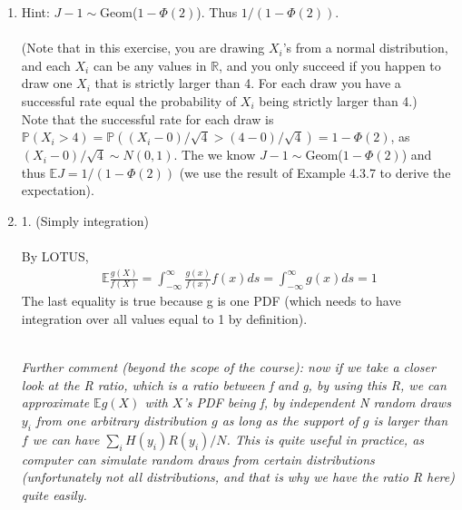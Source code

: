 

\setcounter{theorem}{54}
\begin{exercise}[BH.5.55]
\begin{solution}
    \begin{enumerate}
	    \item Hint: $J-1\sim$Geom($1-\Phi(2)$). Thus $1/(1-\Phi(2))$.\\~\\
    	(Note that in this exercise, you are drawing $X_i$'s from a normal distribution, and each $X_i$ can be any values in $\mathbb{R}$, and you only succeed if you happen to draw one $X_i$ that is strictly larger than 4. For each draw you have a successful rate equal the probability of $X_i$ being strictly larger than 4.)\\
    	
    	Note that the successful rate for each draw is $\mathbb{P}\left(X_i >4 \right)=\mathbb{P}\left((X_i-0)/\sqrt{4} >(4-0)/\sqrt{4} \right) =1-\Phi(2)$, as $(X_i-0)/\sqrt{4}\sim N(0,1)$. The we know  $J-1\sim$Geom($1-\Phi(2)$) and thus $\mathbb{E}J=1/(1-\Phi(2))$ (we use the result of Example 4.3.7 to derive the expectation). 
    	\item 1. (Simply integration)\\~\\
    	By LOTUS,
    	\begin{align*}
    		\mathbb{E}\frac{g(X)}{f(X)} = \int_{-\infty}^{\infty} \frac{g(x)}{f(x)} f(x) ds= \int_{-\infty}^{\infty} {g(x)}  ds=1
    	\end{align*}
    	The last equality is true because g is one PDF (which needs to have integration over all values equal to 1 by definition). 
    	
    	~\\
    	\textit{Further comment (beyond the scope of the course): now if we take a closer look at the R ratio, which is a ratio between f and g, by using this R, we can approximate $\mathbb{E}g(X)$ with $X$'s PDF being f, by independent N random draws $y_i$ from one arbitrary distribution $g$ as long as the support of $g$ is larger than $f$ we can have $\sum_i H(y_i)R(y_i)/N $. This is quite useful in practice, as computer can simulate random draws from certain distributions (unfortunately not all distributions, and that is why we have the ratio R here) quite easily.}
    	 

\end{enumerate}
\end{solution}
\end{exercise}
